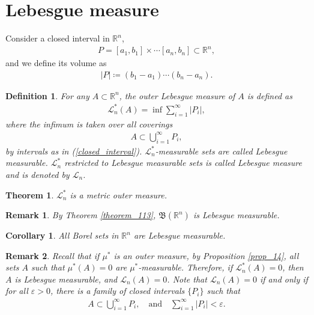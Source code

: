 \documentclass[11pt]{book}
\newtheorem{definition}{Definition}[chapter]
\newtheorem{theorem}{Theorem}[chapter]
\newtheorem{corollary}{Corollary}[theorem]
\newtheorem{remark}{Remark}[chapter]
\theoremstyle{definition}
\numberwithin{equation}{chapter}
\def\BB{\mathfrak{B}}
\begin{document}
\section{Lebesgue measure}

Consider a closed interval in $\mathbb{R}^n$,
\begin{align}\label{closed_interval}
    P = [a_1,b_1] \times \cdots [a_n,b_n] \subset \mathbb{R}^n,
\end{align}
and we define its volume as 
\begin{align*}
    \left|P\right| \coloneqq (b_1-a_1) \cdots (b_n-a_n).
\end{align*}

\medskip

\begin{definition}
For any $A \subset \mathbb{R}^n$, the outer Lebesgue measure of $A$ is defined as
\begin{align*}
    \mathcal{L}^*_n(A) = \inf \sum^\infty_{i=1} \left|P_i\right|,
\end{align*}
where the infimum is taken over all coverings 
\begin{align*}
    A \subset \bigcup^\infty_{i=1} P_i,
\end{align*}
by intervals as in (\ref{closed_interval}). $\mathcal{L}^*_n$-measurable sets are called Lebesgue measurable. $\mathcal{L}^*_n$ restricted to Lebesgue measurable sets is called Lebesgue measure and is denoted by $\mathcal{L}_n$.
\end{definition}

\medskip

\begin{theorem}
$\mathcal{L}^*_n$ is a metric outer measure.
\end{theorem}

\medskip

\begin{remark}
By Theorem \ref{theorem_113}, $\BB(\mathbb{R}^n)$ is Lebesgue measurable.
\end{remark}

\medskip

\begin{corollary}\label{coro_17}
All Borel sets in $\mathbb{R}^n$ are Lebesgue measurable. 
\end{corollary}

\medskip

\begin{remark}\label{remark_17}
Recall that if $\mu^*$ is an outer measure, by Proposition \ref{prop_14}, all sets $A$ such that $\mu^*(A) = 0$ are $\mu^*$-measurable. Therefore, if $\mathcal{L}^*_n(A) = 0$, then $A$ is Lebesgue measurable, and $\mathcal{L}_n(A) = 0$. Note that $\mathcal{L}_n(A) = 0$ if and only if for all $\varepsilon > 0$, there is a family of closed intervals $\{P_i\}$ such that 
\begin{align*}
    A \subset \bigcup^\infty_{i=1} P_i, \quad \text{and} \quad \sum^\infty_{i=1} \left|P_i\right| < \varepsilon.
\end{align*}
\end{remark}
\end{document}
